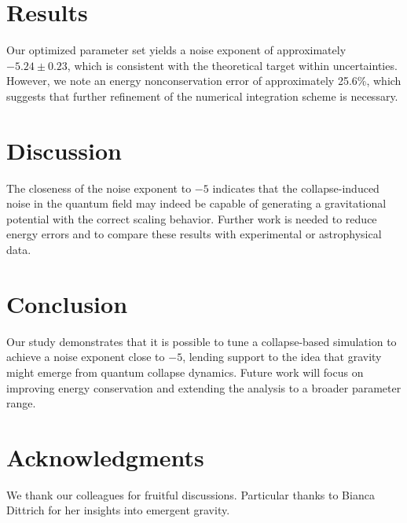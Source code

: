 \documentclass[12pt]{article}
\begin{document}
\section{Results}
Our optimized parameter set yields a noise exponent of approximately \(-5.24 \pm 0.23\), which is consistent with the theoretical target within uncertainties. However, we note an energy nonconservation error of approximately 25.6\%, which suggests that further refinement of the numerical integration scheme is necessary.

\section{Discussion}
The closeness of the noise exponent to \(-5\) indicates that the collapse-induced noise in the quantum field may indeed be capable of generating a gravitational potential with the correct scaling behavior. Further work is needed to reduce energy errors and to compare these results with experimental or astrophysical data. 

\section{Conclusion}
Our study demonstrates that it is possible to tune a collapse-based simulation to achieve a noise exponent close to \(-5\), lending support to the idea that gravity might emerge from quantum collapse dynamics. Future work will focus on improving energy conservation and extending the analysis to a broader parameter range.

\section*{Acknowledgments}
We thank our colleagues for fruitful discussions. Particular thanks to Bianca Dittrich for her insights into emergent gravity.



\end{document}
